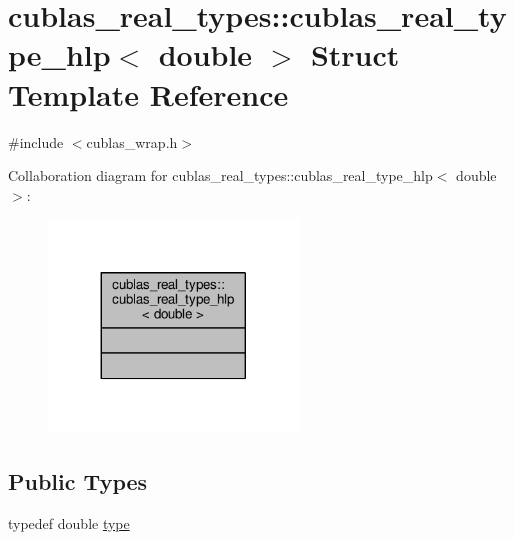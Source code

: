 \hypertarget{structcublas__real__types_1_1cublas__real__type__hlp_3_01double_01_4}{\section{cublas\-\_\-real\-\_\-types\-:\-:cublas\-\_\-real\-\_\-type\-\_\-hlp$<$ double $>$ Struct Template Reference}
\label{structcublas__real__types_1_1cublas__real__type__hlp_3_01double_01_4}
}


{\ttfamily \#include $<$cublas\-\_\-wrap.\-h$>$}



Collaboration diagram for cublas\-\_\-real\-\_\-types\-:\-:cublas\-\_\-real\-\_\-type\-\_\-hlp$<$ double $>$\-:
\nopagebreak
\begin{figure}[H]
\begin{center}
\leavevmode
\includegraphics[width=188pt]{structcublas__real__types_1_1cublas__real__type__hlp_3_01double_01_4__coll__graph}
\end{center}
\end{figure}
\subsection*{Public Types}
\begin{DoxyCompactItemize}
\item 
typedef double \hyperlink{structcublas__real__types_1_1cublas__real__type__hlp_3_01double_01_4_ac11479e7b81a80ff99ba21fad166d819}{type}
\end{DoxyCompactItemize}



